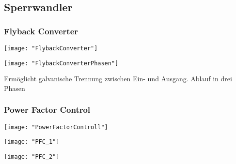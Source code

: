
\subsection{Sperrwandler}
\subsubsection{Flyback Converter}
\begin{minipage}[t]{0.3\textwidth}
	\vspace{0pt}								%
	\texttt{[image: "FlybackConverter"]}
\end{minipage}\hspace{0.05\textwidth}
\begin{minipage}[t]{0.3\textwidth}
	\vspace{0pt}
	\texttt{[image: "FlybackConverterPhasen"]}
\end{minipage}
\begin{minipage}[t]{0.3\textwidth}
	\vspace{0pt}
	Ermöglicht galvanische Trennung zwischen Ein- und Ausgang.
	Ablauf in drei Phasen
\end{minipage}
\vspace{2mm}


\subsubsection{Power Factor Control}
\begin{minipage}[t]{0.3\textwidth}
	\vspace{0pt}								%
	\texttt{[image: "PowerFactorControll"]}
\end{minipage}\hspace{0.05\textwidth}
\begin{minipage}[t]{0.3\textwidth}
	\vspace{0pt}
	\texttt{[image: "PFC\_1"]}
\end{minipage}
\begin{minipage}[t]{0.3\textwidth}
	\vspace{0pt}
	\texttt{[image: "PFC\_2"]}
\end{minipage}
\vspace{2mm}


